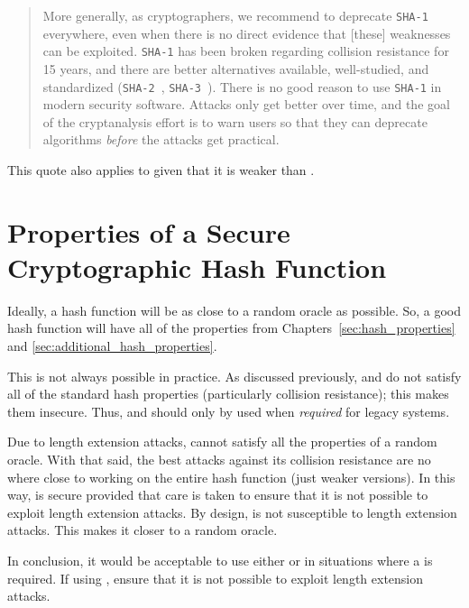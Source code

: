 \begin{quote}
    More generally, as cryptographers, we recommend to deprecate
    \texttt{SHA-1} everywhere, even when there is no direct evidence
    that [these] weaknesses can be exploited.
    \texttt{SHA-1} has been broken regarding collision resistance for 15 years,
    and there are better alternatives available, well-studied,
    and standardized (\texttt{SHA-2}~\cite{FIPS-180-4-2015},
    \texttt{SHA-3}~\cite{FIPS-202}).
    There is no good reason to use \texttt{SHA-1} in modern security software.
    Attacks only get better over time,
    and the goal of the cryptanalysis effort is to warn users
    so that they can deprecate algorithms
    \emph{before} the attacks get practical.
\end{quote}

\noindent
This quote also applies to \MDFive{} given that it is weaker than \ShaOne{}.







\section{Properties of a Secure Cryptographic Hash Function}

Ideally, a \gls{hash function} will be as close to a
\gls{random oracle} as possible.
So, a good \gls{hash function} will have all of the properties
from Chapters~\ref{sec:hash_properties} and
\ref{sec:additional_hash_properties}.

This is not always possible in practice.
As discussed previously, \MDFive{} and \ShaOne{} do not satisfy
all of the standard hash properties (particularly collision resistance);
this makes them insecure.
Thus, \MDFive{} and \ShaOne{} should only by used
when \emph{required} for legacy systems.

Due to length extension attacks, \ShaTwo{} cannot satisfy
all the properties of a \gls{random oracle}.
With that said, the best attacks against its collision resistance
are no where close to working on the entire \gls{hash function}
(just weaker versions).
In this way, \ShaTwo{} is secure provided that care is taken
to ensure that it is not possible to exploit length extension attacks.
By design, \ShaThree{} is not susceptible to length extension attacks.
This makes it closer to a \gls{random oracle}.

In conclusion, it would be acceptable to use either \ShaTwo{} or \ShaThree{}
in situations where a  is required.
If using \ShaTwo{}, ensure that it is not possible
to exploit length extension attacks.

